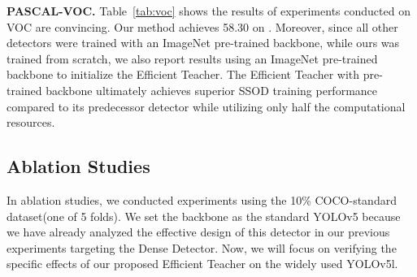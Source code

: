 \documentclass[10pt,twocolumn,letterpaper]{article}
\begin{document}
\textbf{PASCAL-VOC.} Table~\ref{tab:voc} shows the results of experiments conducted on VOC are convincing. Our method achieves 58.30 on . Moreover, since all other detectors were trained with an ImageNet pre-trained backbone, while ours was trained from scratch, we also report results using an ImageNet pre-trained backbone to initialize the Efficient Teacher. The Efficient Teacher with pre-trained backbone ultimately achieves superior SSOD training performance compared to its predecessor detector while utilizing only half the computational resources.
\begin{table}[h]
  \centering 
  \caption{Experimental results on PASCAL-VOC. The  indicates using a ImageNet pre-trained backbone to initialize the Efficient Teacher }
  \label{tab:voc}
\end{table}

\subsection{Ablation Studies}
In ablation studies, we conducted experiments using the 10\% COCO-standard dataset(one of 5 folds). We set the backbone as the standard YOLOv5 because we have already analyzed the effective design of this detector in our previous experiments targeting the Dense Detector. Now, we will focus on verifying the specific effects of our proposed Efficient Teacher on the widely used YOLOv5l.
\end{document}
